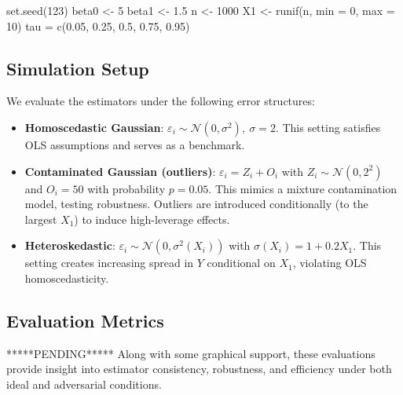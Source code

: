\documentclass[fleqn,8pt]{latex/stylish_article} %
\newenvironment{Shaded}{\begin{snugshade}}{\end{snugshade}}
\newcommand{\DecValTok}[1]{\textcolor[rgb]{0.00,0.00,0.81}{{#1}}}
\newcommand{\FloatTok}[1]{\textcolor[rgb]{0.00,0.00,0.81}{{#1}}}
\newcommand{\OtherTok}[1]{\textcolor[rgb]{0.56,0.35,0.01}{{#1}}}
\newcommand{\FunctionTok}[1]{\textcolor[rgb]{0.00,0.00,0.00}{{#1}}}
\newcommand{\AttributeTok}[1]{\textcolor[rgb]{0.77,0.63,0.00}{{#1}}}
\newcommand{\NormalTok}[1]{{#1}}
\begin{document}
\begin{Shaded}
\begin{Highlighting}[]
\FunctionTok{set.seed}\NormalTok{(}\DecValTok{123}\NormalTok{)}
\NormalTok{beta0 }\OtherTok{\textless{}{-}} \DecValTok{5}
\NormalTok{beta1 }\OtherTok{\textless{}{-}} \FloatTok{1.5}
\NormalTok{n }\OtherTok{\textless{}{-}} \DecValTok{1000}
\NormalTok{X1 }\OtherTok{\textless{}{-}} \FunctionTok{runif}\NormalTok{(n, }\AttributeTok{min =} \DecValTok{0}\NormalTok{, }\AttributeTok{max =} \DecValTok{10}\NormalTok{)}
\NormalTok{tau }\OtherTok{=} \FunctionTok{c}\NormalTok{(}\FloatTok{0.05}\NormalTok{, }\FloatTok{0.25}\NormalTok{, }\FloatTok{0.5}\NormalTok{, }\FloatTok{0.75}\NormalTok{, }\FloatTok{0.95}\NormalTok{)}
\end{Highlighting}
\end{Shaded}

\subsection{Simulation Setup}\label{simulation-setup}

We evaluate the estimators under the following error structures:

\begin{itemize}
\item
  \textbf{Homoscedastic Gaussian}:
  \(\varepsilon_i \sim \mathcal{N}(0, \sigma^2),\ \sigma=2\). This setting satisfies OLS assumptions and serves as a benchmark.
\item
  \textbf{Contaminated Gaussian (outliers)}:
  \(\varepsilon_i = Z_i + O_i\) with \(Z_i \sim \mathcal{N}(0,2^2)\) and \(O_i = 50\) with probability \(p = 0.05\). This mimics a mixture contamination model, testing robustness. Outliers are introduced conditionally (to the largest \(X_1\)) to induce high-leverage effects.
\item
  \textbf{Heteroskedastic}:
  \(\varepsilon_i \sim \mathcal{N}(0,\sigma^2(X_i))\) with \(\sigma(X_i) = 1 + 0.2 X_1\). This setting creates increasing spread in \(Y\) conditional on \(X_1\), violating OLS homoscedasticity.
\end{itemize}

\subsection{Evaluation Metrics}\label{evaluation-metrics}

*****PENDING*****
Along with some graphical support, these evaluations provide insight into estimator consistency, robustness, and efficiency under both ideal and adversarial conditions.
\end{document}
